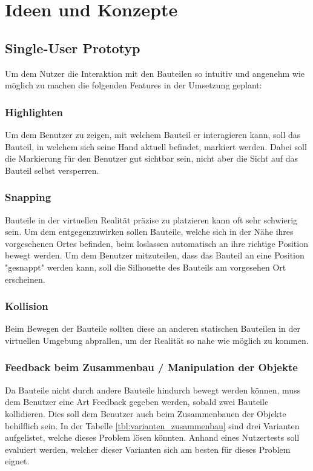 \chapter{Ideen und Konzepte}
\label{ch:Ideen_und_Konzepte}

\section{Single-User Prototyp}
Um dem Nutzer die Interaktion mit den Bauteilen so intuitiv und angenehm wie möglich zu machen die folgenden Features in der Umsetzung geplant:

\subsection{Highlighten}
Um dem Benutzer zu zeigen, mit welchem Bauteil er interagieren kann, soll das Bauteil, in welchem sich seine Hand aktuell befindet, markiert werden. Dabei soll die Markierung für den Benutzer gut sichtbar sein, nicht aber die Sicht auf das Bauteil selbst versperren.
	
	
\subsection{Snapping}
Bauteile in der virtuellen Realität präzise zu platzieren kann oft sehr schwierig sein. Um dem entgegenzuwirken sollen Bauteile, welche sich in der Nähe ihres vorgesehenen Ortes befinden, beim loslassen automatisch an ihre richtige Position bewegt werden. Um dem Benutzer mitzuteilen, dass das Bauteil an eine Position "gesnappt" werden kann, soll die Silhouette des Bauteils am vorgesehen Ort erscheinen. 
	
\subsection{Kollision}
Beim Bewegen der Bauteile sollten diese an anderen statischen Bauteilen in der virtuellen Umgebung abprallen, um der Realität so nahe wie möglich zu kommen. 
	
\subsection{Feedback beim Zusammenbau / Manipulation der Objekte}
Da Bauteile nicht durch andere Bauteile hindurch bewegt werden können, muss dem Benutzer eine Art Feedback gegeben werden, sobald zwei Bauteile kollidieren. Dies soll dem Benutzer auch beim Zusammenbauen der Objekte behilflich sein. In der Tabelle \ref{tbl:varianten_zusammenbau} sind drei Varianten aufgelistet, welche dieses Problem lösen könnten. Anhand eines Nutzertests soll evaluiert werden, welcher dieser Varianten sich am besten für dieses Problem eignet.
	
